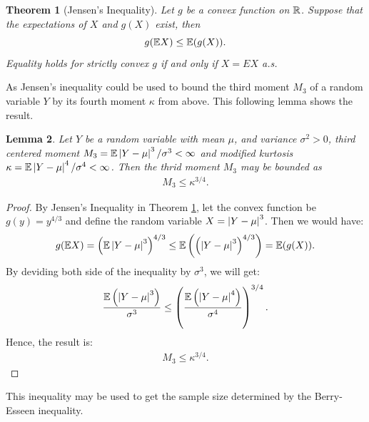 \documentclass{iitthesis}
\newtheorem{theorem}{Theorem}[section]
\newtheorem{lemma}[theorem]{Lemma}
\theoremstyle{definition}
\begin{document}
\begin{theorem}[Jensen's Inequality{\cite[8.4a]{LB10}}]\label{Jensen}
Let $g$ be a convex function on $\mathbb{R}$. Suppose that the expectations of $X$ and $g(X)$ exist, then
$$g(\mathbb{E} X) \leq \mathbb{E}(g(X)).$$
Equality holds for strictly convex $g$ if and only if $X=EX$ a.s.
\end{theorem}
As Jensen's inequality could be used to bound the third moment $M_3$ of a random variable $Y$ by its fourth moment $\kappa$ from above. This following lemma shows the result.
\begin{lemma}\label{M3kappalemma}
Let $Y$ be a random variable with mean $\mu$, and variance $\sigma^2>0$, third centered moment $M_3 = \mathbb{E}\left \lvert Y-\mu \right \rvert^3/\sigma^3 < \infty$ and modified kurtosis $\kappa = \mathbb{E}\left \lvert Y-\mu \right \rvert^4/\sigma^4< \infty$. Then the thrid moment $M_3$ may be bounded as 
\begin{align}\label{M3kappa}
M_3\leq \kappa^{3/4}.
\end{align}
\end{lemma}
\begin{proof}
By Jensen's Inequality in Theorem \ref{Jensen}, let the convex function be $g(y) = y^{4/3}$ and define the random variable $X = \left \lvert Y-\mu \right \rvert^3$. Then we would have:
$$g(\mathbb{E} X) = \left (\mathbb{E}\left \lvert Y-\mu \right \rvert^3\right)^{4/3} \leq \mathbb{E}\left(\left(\left \lvert Y-\mu \right \rvert^3\right)^{4/3}\right) = \mathbb{E}(g(X)).$$
By deviding both side of the inequality by $\sigma^3$, we will get:
$$\frac{\mathbb{E}\left(\left \lvert Y-\mu \right \rvert^3\right)}{\sigma^3} \leq \left (\frac{\mathbb{E}\left(\left \lvert Y-\mu \right \rvert^4\right)}{\sigma^4}\right)^{3/4}.$$
Hence, the result is: 
\begin{align}
M_3\leq \kappa^{3/4}.
\end{align}
\end{proof}
This inequality may be used to get the sample size determined by the Berry-Esseen inequality.

\end{document}

